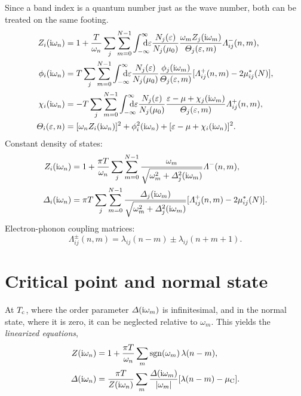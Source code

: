 Since a band index is a quantum number just as the wave number, both can be
treated on the same footing.
%
\begin{align*}
    Z_i(\I \omega_n) &= 1 + \frac T {\omega_n} \sum_j \sum_{m = 0}^{N - 1}
    \int \from{-\infty} \till \infty \D \epsilon
    \frac{N_j(\epsilon)}{N_j(\mu_0)}
    \frac{\omega_m Z_j(\I \omega_m)}{\Theta_j(\epsilon, m)}
    \Lambda_{i j}^-(n, m),
    \\
    \phi_i(\I \omega_n) &= T \sum_j \sum_{m = 0}^{N - 1}
    \int \from{-\infty} \till \infty \D \epsilon
    \frac{N_j(\epsilon)}{N_j(\mu_0)}
    \frac{\phi_j(\I \omega_m)}{\Theta_j(\epsilon, m)}
    [\Lambda_{i j}^+(n, m) - 2 \mu^*_{i j}(N)],
    \\
    \chi_i(\I \omega_n) &= -T \sum_j \sum_{m = 0}^{N - 1}
    \int \from{-\infty} \till \infty \D \epsilon
    \frac{N_j(\epsilon)}{N_j(\mu_0)}
    \frac{\epsilon - \mu + \chi_j(\I \omega_m)}{\Theta_j(\epsilon, m)}
    \Lambda_{i j}^+(n, m),
    \\
    \Theta_i(\epsilon, n) &= [\omega_n Z_i(\I \omega_n)]^2
    + \phi_i^2(\I \omega_n) + [\epsilon - \mu + \chi_i(\I \omega_n)]^2.
\end{align*}
%
Constant density of states:
%
\begin{align*}
    Z_i(\mathrm i \omega_n) &= 1 + \frac{\pi T}{\omega_n} \sum_j \sum_{m = 0}^{N - 1}
    \frac{\omega_m}{\sqrt{\omega_m^2 + \varDelta_j^2(\mathrm i \omega_m)}}
    \varLambda^-(n, m),
    \\
    \varDelta_i(\mathrm i \omega_n) &= \pi T \sum_j \sum_{m = 0}^{N - 1}
    \frac
        {\varDelta_j(\mathrm i \omega_m)}
        {\sqrt{\omega_m^2 + \varDelta_j^2(\mathrm i \omega_m)}}
    [\varLambda_{i j}^+(n, m) - 2 \mu^*_{i j}(N)].
\end{align*}
%
Electron-phonon coupling matrices:
%
\begin{equation*}
    \Lambda_{i j}^\pm(n, m) = \lambda_{i j}(n - m) \pm \lambda_{i j}(n + m + 1).
\end{equation*}

\section{Critical point and normal state}

At $T \sb{\text{c}}$, where the order parameter $\varDelta(\mathrm i \omega_m)$ is infinitesimal,
and in the normal state, where it is zero, it can be neglected relative to
$\omega_m$. This yields the \emph{linearized  equations},
%
\begin{subequations} \label{linearized Eliashberg equations}
    \begin{align}
        Z(\mathrm i \omega_n) &= 1 + \frac{\pi T}{\omega_n} \sum_m
        \operatorname{sgn}(\omega_m) \, \lambda(n - m),
        \\
        \varDelta(\mathrm i \omega_n) &= \frac{\pi T}{Z(\mathrm i \omega_n)} \sum_m
        \frac{\varDelta(\mathrm i \omega_m)}{|\omega_m|}
        [\lambda(n - m) - \mu \sb{\text{C}}].
    \end{align}
\end{subequations}

